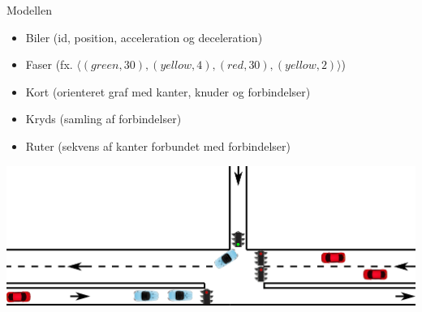\begin{frame}{Modellen}
\begin{itemize}
\item Biler (id, position, acceleration og deceleration)
\item Faser (fx. $\langle(green, 30), (yellow, 4), (red, 30), (yellow, 2)\rangle$)
\item Kort (orienteret graf med kanter, knuder og forbindelser)
\item Kryds (samling af forbindelser)
\item Ruter (sekvens af kanter forbundet med forbindelser)
\end{itemize}

\includegraphics[width=1\textwidth]{../images/introNetworkSimple.png}
\end{frame}
